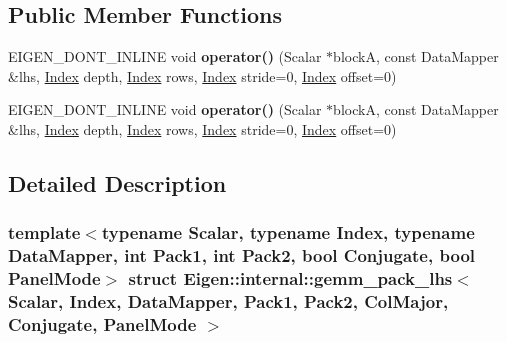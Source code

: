 \subsection*{Public Member Functions}
\begin{DoxyCompactItemize}
\item 
\mbox{\label{struct_eigen_1_1internal_1_1gemm__pack__lhs_3_01_scalar_00_01_index_00_01_data_mapper_00_01_pack35996411e68d7a1338c3213e7fcd18dc_a48cd625619c2e72101fe67d74385fc82}} 
E\+I\+G\+E\+N\+\_\+\+D\+O\+N\+T\+\_\+\+I\+N\+L\+I\+NE void {\bfseries operator()} (Scalar $\ast$blockA, const Data\+Mapper \&lhs, \hyperlink{namespace_eigen_a62e77e0933482dafde8fe197d9a2cfde}{Index} depth, \hyperlink{namespace_eigen_a62e77e0933482dafde8fe197d9a2cfde}{Index} rows, \hyperlink{namespace_eigen_a62e77e0933482dafde8fe197d9a2cfde}{Index} stride=0, \hyperlink{namespace_eigen_a62e77e0933482dafde8fe197d9a2cfde}{Index} offset=0)
\item 
\mbox{\label{struct_eigen_1_1internal_1_1gemm__pack__lhs_3_01_scalar_00_01_index_00_01_data_mapper_00_01_pack35996411e68d7a1338c3213e7fcd18dc_a48cd625619c2e72101fe67d74385fc82}} 
E\+I\+G\+E\+N\+\_\+\+D\+O\+N\+T\+\_\+\+I\+N\+L\+I\+NE void {\bfseries operator()} (Scalar $\ast$blockA, const Data\+Mapper \&lhs, \hyperlink{namespace_eigen_a62e77e0933482dafde8fe197d9a2cfde}{Index} depth, \hyperlink{namespace_eigen_a62e77e0933482dafde8fe197d9a2cfde}{Index} rows, \hyperlink{namespace_eigen_a62e77e0933482dafde8fe197d9a2cfde}{Index} stride=0, \hyperlink{namespace_eigen_a62e77e0933482dafde8fe197d9a2cfde}{Index} offset=0)
\end{DoxyCompactItemize}


\subsection{Detailed Description}
\subsubsection*{template$<$typename Scalar, typename Index, typename Data\+Mapper, int Pack1, int Pack2, bool Conjugate, bool Panel\+Mode$>$\newline
struct Eigen\+::internal\+::gemm\+\_\+pack\+\_\+lhs$<$ Scalar, Index, Data\+Mapper, Pack1, Pack2, Col\+Major, Conjugate, Panel\+Mode $>$}



